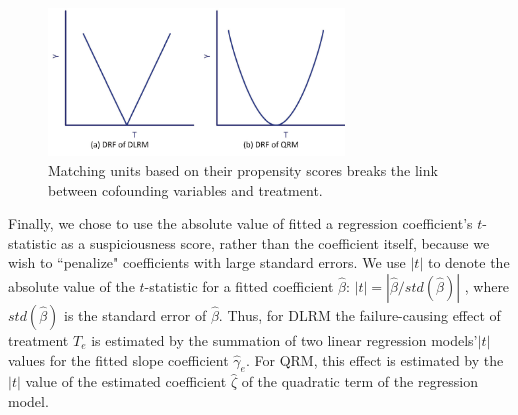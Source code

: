 \begin{figure}[!thpb]
\centering
\includegraphics[width=0.7\textwidth]{chapter3_DRF_curves.pdf}
\caption{Matching units based on their propensity scores breaks the link between cofounding variables and treatment.}
\label{DRF_curves}
\end{figure}
\vspace{-0.1cm}

Finally, we chose to use the absolute value of fitted a regression coefficient's $t$-statistic \cite{Nachtsheim2004} as a suspiciousness score, rather than the coefficient itself, because we wish to ``penalize" coefficients with large standard errors.  We use $\left| t \right|$ to denote the absolute value of the $t$-statistic for a fitted coefficient $\hat \beta $: $\left| t \right| = |\hat \beta /std ( {\hat \beta })|$ , where $std(\hat \beta)$ is the standard error of $\hat \beta$.  Thus, for DLRM the failure-causing effect of treatment $T_e$ is estimated by the summation of two linear regression models'$\left| t \right|$ values for the fitted slope coefficient ${{\hat \gamma }_e}$.  For QRM, this effect is estimated by the $\left| t \right|$ value of the estimated coefficient ${\hat \zeta }$ of the quadratic term of the regression model.

